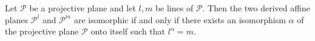 Let $\mathcal{P}$ be a projective plane and let $l, m$ be lines of $\mathcal{P}$. Then the two derived affine planes $\mathcal{P}^l$ and $\mathcal{P}^m$ are isomorphic if and only if there exists an isomorphism $\alpha$ of the projective plane $\mathcal{P}$ onto itself such that $l^\alpha = m$.
